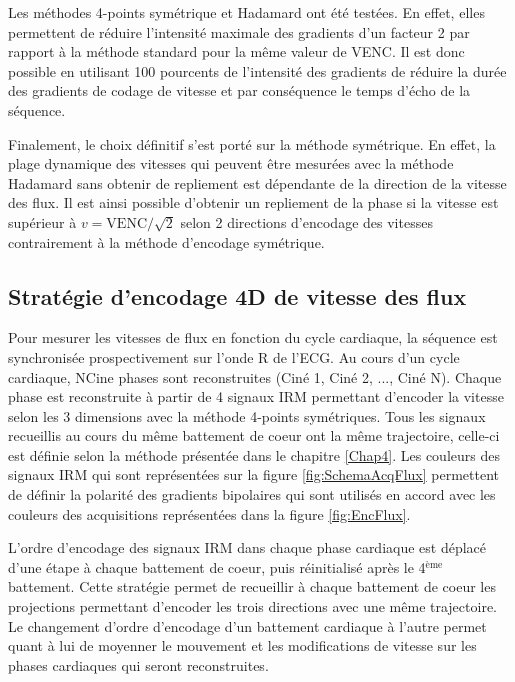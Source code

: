 Les méthodes 4-points symétrique et Hadamard ont été testées. En effet, elles permettent de réduire l’intensité maximale des gradients d’un facteur 2 par rapport à la méthode standard pour la même valeur de VENC. Il est donc possible en utilisant 100 pourcents de l'intensité des gradients de réduire la durée des gradients de codage de vitesse et par conséquence le temps d’écho de la séquence.

Finalement, le choix définitif s'est porté sur la méthode symétrique. En effet, la plage dynamique des vitesses qui peuvent être mesurées avec la méthode Hadamard sans obtenir de repliement est dépendante de la direction de la vitesse des flux. Il est ainsi possible d'obtenir un repliement de la phase si la vitesse est supérieur à $v=\text{VENC}/\sqrt{2} $ selon 2 directions d'encodage des vitesses \cite{Pelc:1991aa} contrairement à la méthode d'encodage symétrique.

\subsection{Stratégie d'encodage 4D de vitesse des flux}

Pour mesurer les vitesses de flux en fonction du cycle cardiaque, la séquence est synchronisée prospectivement sur l’onde R de l'ECG. Au cours d'un cycle cardiaque, NCine phases sont reconstruites (Ciné 1, Ciné 2, ..., Ciné N). Chaque phase est reconstruite à partir de 4 signaux IRM permettant d'encoder la vitesse selon les 3 dimensions avec la méthode 4-points symétriques. Tous les signaux recueillis au cours du même battement de coeur ont la même trajectoire, celle-ci est définie selon la méthode présentée dans le chapitre \ref{Chap4}. Les couleurs des signaux IRM qui sont représentées sur la figure \ref{fig:SchemaAcqFlux} permettent de définir la polarité des gradients bipolaires qui sont utilisés en accord avec les couleurs des acquisitions représentées dans la figure \ref{fig:EncFlux}. 

L'ordre d'encodage des signaux IRM dans chaque phase cardiaque est déplacé d'une étape à chaque battement de coeur, puis réinitialisé après le 4$^\text{ème}$ battement. Cette stratégie permet de recueillir à chaque battement de coeur les projections permettant d'encoder les trois directions avec une même trajectoire. Le changement d'ordre d'encodage d'un battement cardiaque à l'autre permet quant à lui de moyenner le mouvement et les modifications de vitesse sur les phases cardiaques qui seront reconstruites.

